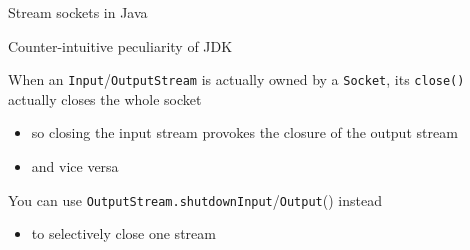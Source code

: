 \documentclass[presentation]{beamer}\mode<presentation>{\usetheme{AMSBolognaFC}}
\begin{document}
\begin{frame}[c, allowframebreaks]{Stream sockets in Java}
    \begin{alertblock}{Counter-intuitive peculiarity of JDK}
        \begin{description}
            \item When an \texttt{Input}/\texttt{OutputStream} is actually owned by a \texttt{Socket}, its \texttt{\alert{close()}} actually closes the whole socket
            \begin{itemize}
                \item so closing the input stream provokes the closure of the output stream
                \item and vice versa
            \end{itemize}
            \item You can use \texttt{OutputStream.}\alert{\texttt{shutdownInput}/\texttt{Output}()} instead
            \begin{itemize}
                \item to selectively close one stream
            \end{itemize}
        \end{description}
    \end{alertblock}

\end{frame}
\end{document}
